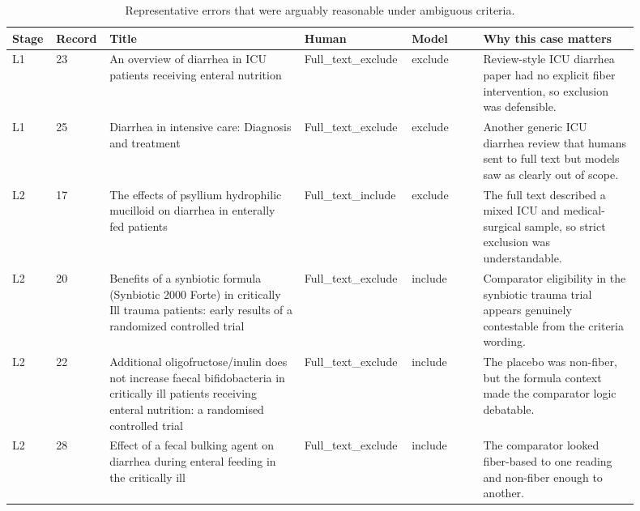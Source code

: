 \begin{table}[ht]
\centering
\caption{Representative errors that were arguably reasonable under ambiguous criteria.}
\label{tab:fiber-ambiguous-errors}
\begin{tabular}{p{0.06\linewidth} p{0.06\linewidth} p{0.30\linewidth} p{0.13\linewidth} p{0.11\linewidth} p{0.24\linewidth}}
\hline
Stage & Record & Title & Human & Model & Why this case matters \\
\hline
L1 & 23 & An overview of diarrhea in ICU patients receiving enteral nutrition & Full\_text\_exclude & exclude & Review-style ICU diarrhea paper had no explicit fiber intervention, so exclusion was defensible. \\
L1 & 25 & Diarrhea in intensive care: Diagnosis and treatment & Full\_text\_exclude & exclude & Another generic ICU diarrhea review that humans sent to full text but models saw as clearly out of scope. \\
L2 & 17 & The effects of psyllium hydrophilic mucilloid on diarrhea in enterally fed patients & Full\_text\_include & exclude & The full text described a mixed ICU and medical-surgical sample, so strict exclusion was understandable. \\
L2 & 20 & Benefits of a synbiotic formula (Synbiotic 2000 Forte) in critically Ill trauma patients: early results of a randomized controlled trial & Full\_text\_exclude & include & Comparator eligibility in the synbiotic trauma trial appears genuinely contestable from the criteria wording. \\
L2 & 22 & Additional oligofructose/inulin does not increase faecal bifidobacteria in critically ill patients receiving enteral nutrition: a randomised controlled trial & Full\_text\_exclude & include & The placebo was non-fiber, but the formula context made the comparator logic debatable. \\
L2 & 28 & Effect of a fecal bulking agent on diarrhea during enteral feeding in the critically ill & Full\_text\_exclude & include & The comparator looked fiber-based to one reading and non-fiber enough to another. \\
\hline
\end{tabular}
\end{table}
